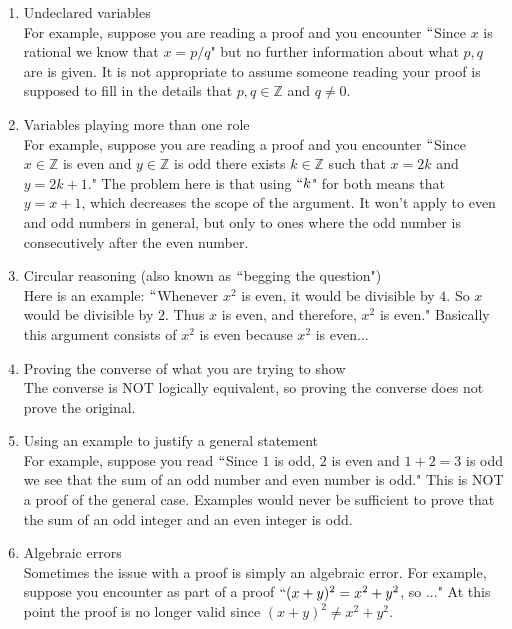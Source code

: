 \documentclass[12pt]{amsart}
\theoremstyle{definition}
\theoremstyle{remark}
\newcommand{\ints}{\mathbb Z}
\begin{document}
\begin{enumerate}

\item  Undeclared variables \\

For example, suppose you are reading a proof and you encounter $``$Since $x$ is rational we know that $x=p/q$" but no further information about what $p,q$ are is given.  It is not appropriate to assume someone reading your proof is supposed to fill in the details that $p,q\in\ints$ and $q\neq 0$.\\ 

\item Variables playing more than one role\\

For example, suppose you are reading a proof and you encounter $``$Since $x\in\ints$ is even and $y\in\ints$ is odd there exists $k\in\ints$ such that $x=2k$ and $y=2k+1$."  The problem here is that using $``k$" for both means that $y=x+1$, which decreases the scope of the argument.  It won't apply to even and odd numbers in general, but only to ones where the odd number is consecutively after the even number.\\

\item Circular reasoning (also known as $``$begging the question")\\

Here is an example: $``$Whenever $x^2$ is even, it would be divisible by $4$.  So $x$ would be divisible by $2$.  Thus $x$ is even, and therefore, $x^2$ is even."  Basically this argument consists of $x^2$ is even because $x^2$ is even...\\

\item Proving the converse of what you are trying to show\\  

The converse is NOT logically equivalent, so proving the converse does not prove the original.\\

\item Using an example to justify a general statement\\

For example, suppose you read $``$Since $1$ is odd, $2$ is even and $1+2=3$ is odd we see that the sum of an odd number and even number is odd."  This is NOT a proof of the general case.  Examples would never be sufficient to prove that the sum of an odd integer and an even integer is odd.\\

\item Algebraic errors\\

Sometimes the issue with a proof is simply an algebraic error.  For example, suppose you encounter as part of a proof $``(x+y)^2=x^2+y^2$, so ..."  At this point the proof is no longer valid since $(x+y)^2\neq x^2+y^2$.

\end{enumerate}
\end{document}
